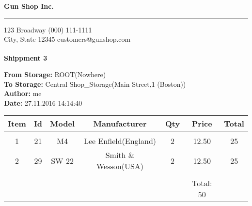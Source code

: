\documentclass{article}
\begin{document}
\hfil{\Huge\bf Gun Shop Inc.}\hfil
\bigskip
\hrule
\bigskip

123 Broadway \hfill (000) 111-1111 \\
City, State 12345 \hfill customers@gunshop.com\\ \\

\hfill{\bf Shippment 3}\hfill
\bigskip

{\bf From Storage:}   ROOT(Nowhere)\\
{\bf To Storage:}  Central Shop\_Storage(Main Street,1 (Boston)) \\
{\bf Author:}  me \\ 
{\bf Date:}  27.11.2016 14:14:40 \\
\begin{center}
\begin{tabular}{ c c c c c c c }
  Item & Id & Model & Manufacturer & Qty & Price & Total  \\[2ex]
\hline\\
 1 & 21 & M4& Lee Enfield(England)& 2 & 12.50 & 25 \\ [2ex] 2 & 29 & SW 22& Smith \& Wesson(USA)& 2 & 12.50 & 25 \\ [2ex]\hline\\&&&&&Total: 50&\end{tabular}\end{center}
\end{document}
